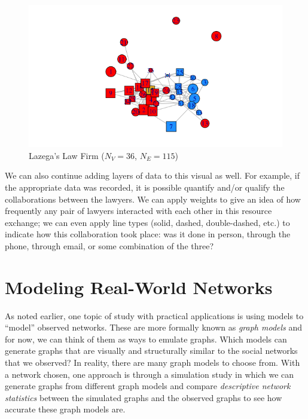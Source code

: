 \documentclass[12pt,twoside]{amherstthesis}
\begin{document}
  \begin{figure}[htbp]
  \centering
  \includegraphics{figure/02lawyerplot.png}
  \caption{Lazega's Law Firm (\(N_V = 36\), \(N_E = 115\))}
  \end{figure}
  
  We can also continue adding layers of data to this visual as well. For
  example, if the appropriate data was recorded, it is possible quantify
  and/or qualify the collaborations between the lawyers. We can apply
  weights to give an idea of how frequently any pair of lawyers interacted
  with each other in this resource exchange; we can even apply line types
  (solid, dashed, double-dashed, etc.) to indicate how this collaboration
  took place: was it done in person, through the phone, through email, or
  some combination of the three?
  
  \section{Modeling Real-World
  Networks}\label{modeling-real-world-networks}
  
  As noted earlier, one topic of study with practical applications is
  using models to ``model'' observed networks. These are more formally
  known as \emph{graph models} and for now, we can think of them as ways
  to emulate graphs. Which models can generate graphs that are visually
  and structurally similar to the social networks that we observed? In
  reality, there are many graph models to choose from. With a network
  chosen, one approach is through a simulation study in which we can
  generate graphs from different graph models and compare
  \emph{descriptive network statistics} between the simulated graphs and
  the observed graphs to see how accurate these graph models are.
  
\end{document}
